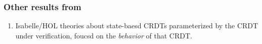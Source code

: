 \documentclass[aspectratio=169,compress]{beamer}
\begin{document}
  \begin{frame}
    \frametitle{Other results from~\cite{zeller14}}
    \begin{enumerate}
      \item Isabelle/HOL theories about state-baesd CRDTs parameterized by the
        CRDT under verification, foucsd on the \textit{behavior} of that CRDT.
    \end{enumerate}
  \end{frame}

  \begin{frame}
    \printbibliography
  \end{frame}
\end{document}
